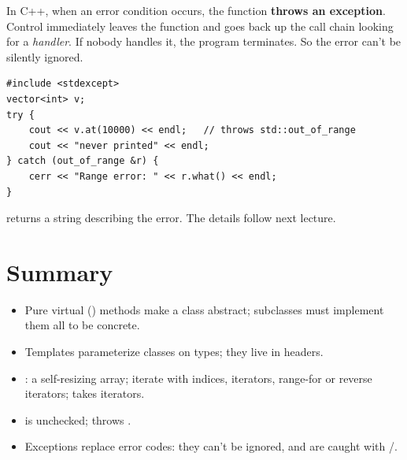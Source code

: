 In C++, when an error condition occurs, the function \textbf{throws an
exception}. Control immediately leaves the function and goes back up the call
chain looking for a \emph{handler}. If nobody handles it, the program
terminates. So the error can't be silently ignored.

\begin{lstlisting}[style=cpp]
#include <stdexcept>
vector<int> v;
try {
    cout << v.at(10000) << endl;   // throws std::out_of_range
    cout << "never printed" << endl;
} catch (out_of_range &r) {
    cerr << "Range error: " << r.what() << endl;
}
\end{lstlisting}
 returns a string describing the error. The details follow next
lecture.

\section*{Summary}
\begin{itemize}
  \item Pure virtual () methods make a class abstract; subclasses must
        implement them all to be concrete.
  \item Templates parameterize classes on types; they live in headers.
  \item {}: a self-resizing array; iterate with indices,
        iterators, range-for or reverse iterators;  takes iterators.
  \item {} is unchecked;  throws .
  \item Exceptions replace error codes: they can't be ignored, and are caught
        with /.
\end{itemize}
